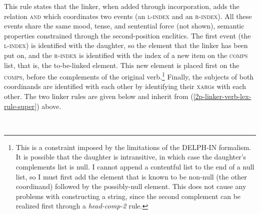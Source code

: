 This rule states that the linker, when added through incorporation, adds the relation \textsc{and} which coordinates two events (an \textsc{l-index} and an \textsc{r-index}). All these events share the same mood, tense, and sentential force (not shown), semantic properties constrained through the second-position enclitics. The first event (the \textsc{l-index}) is identified with the daughter, so the element that the linker has been put on, and the \textsc{r-index} is identified with the index of a new item on the \textsc{comps} list, that is, the to-be-linked element. This new element is placed first on the \textsc{comps}, before the complements of the original verb.\footnote{This is a constraint imposed by the limitations of the DELPH-IN formalism. It is possible that the daughter is intransitive, in which case the daughter's complements list is null. I cannot append a contentful list to the end of a null list, so I must first add the element that is known to be non-null (the other coordinand) followed by the possibly-null element. This does not cause any problems with constructing a string, since the second complement can be realized first through a {\textit{head-comp-2}} rule.} Finally, the subjects of both coordinands are identified with each other by identifying their \textsc{xarg}s with each other. The two linker rules are given below and inherit from (\ref{2p-linker-verb-lex-rule-super}) above.

\begin{singlespacing}
\ex \label{2p-linker-first-lex-rule}
\xe

\ex~ \label{2p-linker-last-lex-rule}
\xe
\end{singlespacing}

